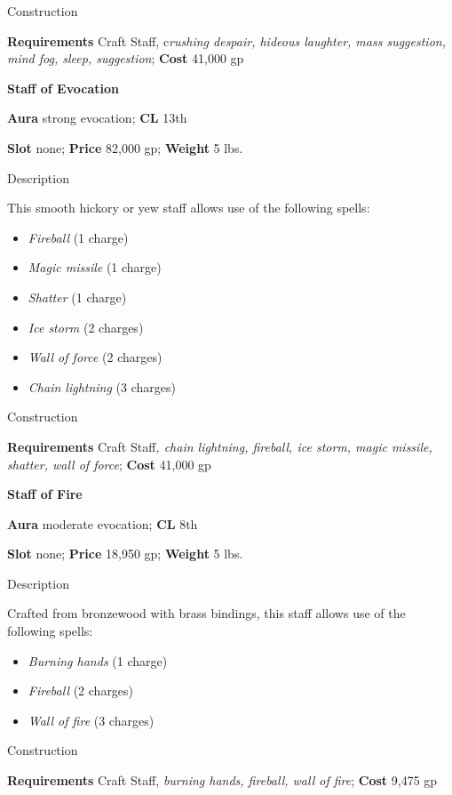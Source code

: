 Construction
				
\textbf{Requirements} Craft Staff, c\textit{rushing despair, hideous laughter, mass suggestion, mind fog, sleep, suggestion}; \textbf{Cost }41,000 gp
				
\textbf{Staff of Evocation}
				
\textbf{Aura} strong evocation; \textbf{CL} 13th
				
\textbf{Slot} none; \textbf{Price} 82,000 gp; \textbf{Weight} 5 lbs.
				
Description
				
This smooth hickory or yew staff allows use of the following spells:
				\begin{itemize}\item  \textit{Fireball} (1 charge)
				\item  \textit{Magic missile} (1 charge)
				\item  \textit{Shatter} (1 charge)
				\item  \textit{Ice storm} (2 charges)
				\item  \textit{Wall of force} (2 charges)
				\item  \textit{Chain lightning} (3 charges) 
\end{itemize}
				
Construction
				
\textbf{Requirements} Craft Staff\textit{, chain lightning, fireball, ice storm, magic missile, shatter, wall of force};\textbf{ Cost }41,000 gp
				
\textbf{Staff of Fire}
				
\textbf{Aura} moderate evocation; \textbf{CL} 8th
				
\textbf{Slot }none; \textbf{Price} 18,950 gp; \textbf{Weight} 5 lbs.
				
Description
				
Crafted from bronzewood with brass bindings, this staff allows use of the following spells:
				\begin{itemize}\item  \textit{Burning hands }(1 charge)
				\item  \textit{Fireball }(2 charges)
				\item  \textit{Wall of fire }(3 charges)
\end{itemize}
				
Construction
				
\textbf{Requirements }Craft Staff, \textit{burning hands, fireball, wall of fire}; \textbf{Cost} 9,475 gp
				
